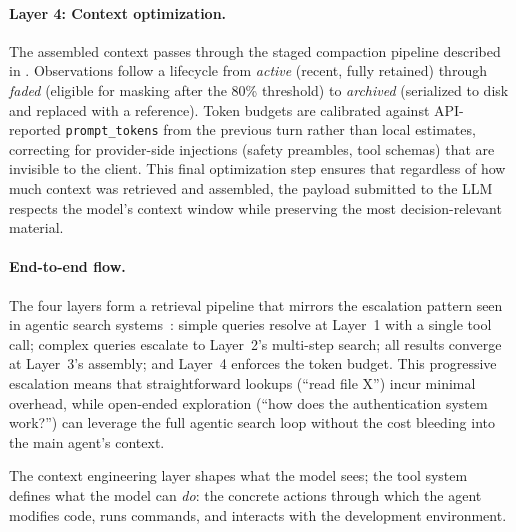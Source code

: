\paragraph{Layer 4: Context optimization.}
The assembled context passes through the staged compaction pipeline described in . Observations follow a lifecycle from \emph{active} (recent, fully retained) through \emph{faded} (eligible for masking after the 80\% threshold) to \emph{archived} (serialized to disk and replaced with a reference). Token budgets are calibrated against API-reported \texttt{prompt\_tokens} from the previous turn rather than local estimates, correcting for provider-side injections (safety preambles, tool schemas) that are invisible to the client. This final optimization step ensures that regardless of how much context was retrieved and assembled, the payload submitted to the LLM respects the model's context window while preserving the most decision-relevant material.

\paragraph{End-to-end flow.} The four layers form a retrieval pipeline that mirrors the escalation pattern seen in agentic search systems~\cite{wei2026agentic}: simple queries resolve at Layer~1 with a single tool call; complex queries escalate to Layer~2's multi-step search; all results converge at Layer~3's assembly; and Layer~4 enforces the token budget. This progressive escalation means that straightforward lookups (``read file X'') incur minimal overhead, while open-ended exploration (``how does the authentication system work?'') can leverage the full agentic search loop without the cost bleeding into the main agent's context.



The context engineering layer shapes what the model sees; the tool system defines what the model can \emph{do}: the concrete actions through which the agent modifies code, runs commands, and interacts with the development environment.






